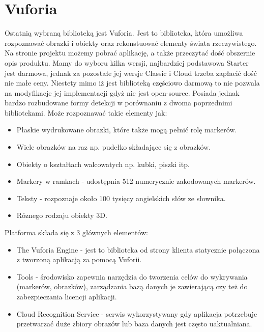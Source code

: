 
\section{Vuforia}
\label{sec:vuforia}

Ostatnią wybraną biblioteką jest Vuforia. Jest to biblioteka, która umożliwa rozpoznawać obrazki i obiekty oraz rekonstuować elementy świata rzeczywistego. Na stronie projektu \cite{Vuforia} możemy pobrać aplikację, a także przeczytać dość obszernie opis produktu. Mamy do wyboru kilka wersji, najbardziej podstawowa Starter jest darmowa, jednak za pozostałe jej wersje Classic i Cloud trzeba zapłacić dość nie małe ceny. Niestety mimo iż jest biblioteką częściowo darmową to nie pozwala na modyfikacje jej implementacji gdyż nie jest open-source. Posiada jednak bardzo rozbudowane formy detekcji w porównaniu z dwoma poprzednimi bibliotekami. Może rozpoznawać takie elementy jak:
\begin{itemize}
	\item Płaskie wydrukowane obrazki, które także mogą pełnić rolę markerów.
	\item Wiele obrazków na raz np. pudełko składające się z obrazków.
	\item Obiekty o kształtach walcowatych np. kubki, piszki itp.
	\item Markery w ramkach - udostępnia 512 numerycznie zakodowanych markerów.
	\item Teksty - rozpoznaje około 100 tysięcy angielskich słów ze słownika.
	\item Róznego rodzaju obiekty 3D.
\end{itemize}

Platforma składa się z 3 głównych elementów:
\begin{itemize}
	\item The Vuforia Engine - jest to biblioteka od strony klienta statycznie połączona z tworzoną aplikacją za pomocą Vuforii.
	\item Tools - środowisko zapewnia narzędzia do tworzenia celów do wykrywania (markerów, obrazków), zarządzania bazą danych je zawierającą czy też do zabezpieczania licencji aplikacji.
	\item Cloud Recognition Service - serwis wykorzystywany gdy aplikacja potrzebuje przetwarzać duże zbiory obrazów lub baza danych jest często uaktualniana.
\end{itemize}


